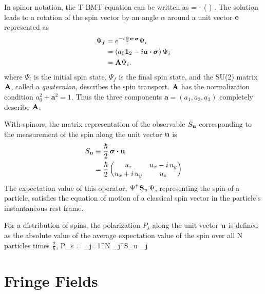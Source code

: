 In spinor notation, the T-BMT equation can be written as
  \Begineq   
     \Psi = -  \left( \bfsig \dotproduct   
    {\pmb\Omega} \right) \Psi.   
  \Endeq   
The solution leads to a rotation of the spin vector by an angle   
$\alpha$ around a unit vector ${\bf e}$ represented as   
  \begin{align}   
    \Psi_f &= e^{-i \frac{\alpha}{2} {\bf e} \mathbin{\boldsymbol{\cdot}} \boldsymbol{\sigma}} \Psi_i \nonumber \\
         &= \left( a_{0} {\bf 1}_{2} - i \boldsymbol{a} \mathbin{\boldsymbol{\cdot}} \boldsymbol{\sigma} \right) \Psi_i \\
         &= {\bf A} \Psi_i. \nonumber
  \end{align}   
where $\Psi_i$ is the initial spin state, $\Psi_f$ is the final spin
state, and the SU(2) matrix ${\bf A}$, called a \textit{quaternion},
describes the spin transport. ${\bf A}$ has the normalization condition
$a_{0}^{2} + \boldsymbol{a}^{2} = 1$. Thus the three components
$\boldsymbol{a} = \left(a_{1}, a_{2}, a_{3}\right)$ completely
describe ${\bf A}$. 

With spinors, the matrix representation of the observable $S_{{\bf u}}$
corresponding to the measurement of the spin along the unit vector
${\bf u}$ is
\begin{align}
  S_{{\bf u}} &\equiv \frac{\hbar}{2} \, \boldsymbol{\sigma} \mathbin{\boldsymbol{\cdot}} {\bf u} \\   
            &= \frac{\hbar}{2} 
                   \begin{pmatrix} 
                     u_z            & u_x - i \, u_y \\
                     u_x + i \, u_y & u_z
                   \end{pmatrix}
\end{align}
The expectation value of this operator, $\Psi^\dagger \, {\bf S}_u \,
\Psi$, representing the spin of a particle, satisfies the equation of
motion of a classical spin vector in the particle's instantaneous rest
frame.

For a distribution of spins, the polarization $P_s$ along the unit
vector ${\bf u}$ is defined as the absolute value of the average
expectation value of the spin over all N particles times
$\frac{2}{\hbar}$,
  \Begineq
    P_s =   \sum_{j=1}^{N} \Psi_j^\dagger S_{\Bf u} \Psi_j
  \Endeq  

\section{Fringe Fields}
\label{s:multi.fringe.std}

